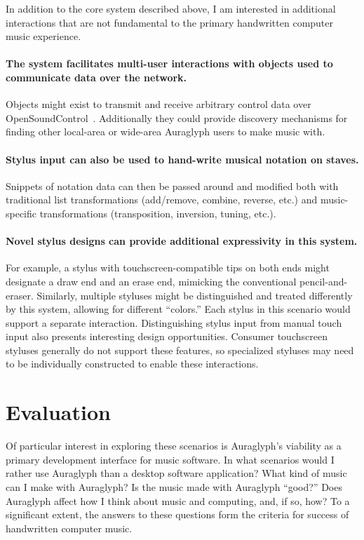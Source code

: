 \documentclass[10pt,letterpaper]{article}
\begin{document}
In addition to the core system described above, I am interested in additional interactions that are not fundamental to the primary handwritten computer music experience. 

\paragraph{The system facilitates multi-user interactions with objects used to communicate data over the network.} 
Objects might exist to transmit and receive arbitrary control data over OpenSoundControl~\cite{wright1997osc}. 
Additionally they could provide discovery mechanisms for finding other local-area or wide-area Auraglyph users to make music with. 

\paragraph{Stylus input can also be used to hand-write musical notation on staves.}
Snippets of notation data can then be passed around and modified both with traditional list transformations (add/remove, combine, reverse, etc.) and music-specific transformations (transposition, inversion, tuning, etc.). 

\paragraph{Novel stylus designs can provide additional expressivity in this system.}
For example, a stylus with touchscreen-compatible tips on both ends might designate a draw end and an erase end, mimicking the conventional pencil-and-eraser. 
Similarly, multiple styluses might be distinguished and treated differently by this system, allowing for different ``colors.''
Each stylus in this scenario would support a separate interaction. 
Distinguishing stylus input from manual touch input also presents interesting design opportunities. 
Consumer touchscreen styluses generally do not support these features, so specialized styluses may need to be individually constructed to enable these interactions. 

\section{Evaluation}
Of particular interest in exploring these scenarios is Auraglyph's viability as a primary development interface for music software. 
In what scenarios would I rather use Auraglyph than a desktop software application? 
What kind of music can I make with Auraglyph? 
Is the music made with Auraglyph ``good?'' 
Does Auraglyph affect how I think about music and computing, and, if so, how? 
To a significant extent, the answers to these questions form the criteria for success of handwritten computer music. 
\end{document}
